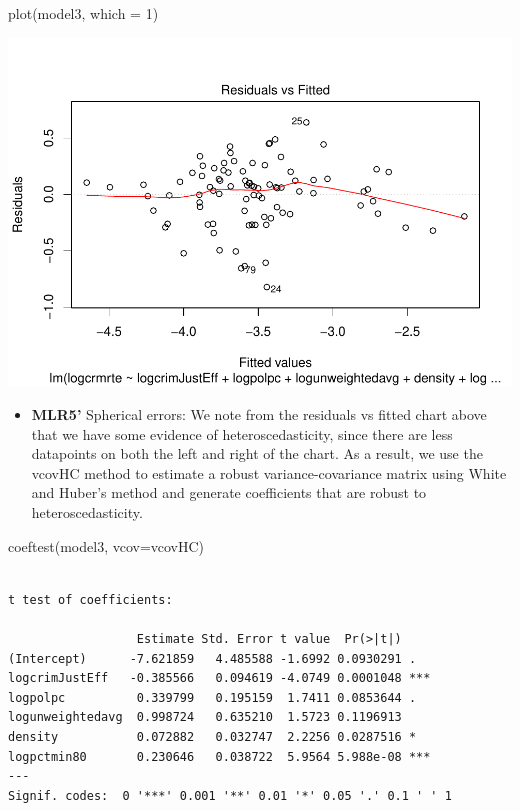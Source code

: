 \documentclass[]{article}
\newenvironment{Shaded}{}{}
\newcommand{\DataTypeTok}[1]{#1}
\newcommand{\DecValTok}[1]{#1}
\newcommand{\KeywordTok}[1]{\textcolor[rgb]{0.00,0.00,1.00}{#1}}
\newcommand{\NormalTok}[1]{#1}
\providecommand{\tightlist}{%
  \setlength{\itemsep}{0pt}\setlength{\parskip}{0pt}}
\begin{document}
\begin{Shaded}
\begin{Highlighting}[]
\KeywordTok{plot}\NormalTok{(model3, }\DataTypeTok{which =} \DecValTok{1}\NormalTok{)}
\end{Highlighting}
\end{Shaded}

\includegraphics{Bagnard_Gaustad_Hartman_Leung_Lab_3_files/figure-latex/unnamed-chunk-99-1.pdf}

\begin{itemize}
\tightlist
\item
  \textbf{MLR5'} Spherical errors: We note from the residuals vs fitted
  chart above that we have some evidence of heteroscedasticity, since
  there are less datapoints on both the left and right of the chart. As
  a result, we use the vcovHC method to estimate a robust
  variance-covariance matrix using White and Huber's method and generate
  coefficients that are robust to heteroscedasticity.
\end{itemize}

\begin{Shaded}
\begin{Highlighting}[]
\KeywordTok{coeftest}\NormalTok{(model3, }\DataTypeTok{vcov=}\NormalTok{vcovHC)}
\end{Highlighting}
\end{Shaded}

\begin{verbatim}

t test of coefficients:

                  Estimate Std. Error t value  Pr(>|t|)    
(Intercept)      -7.621859   4.485588 -1.6992 0.0930291 .  
logcrimJustEff   -0.385566   0.094619 -4.0749 0.0001048 ***
logpolpc          0.339799   0.195159  1.7411 0.0853644 .  
logunweightedavg  0.998724   0.635210  1.5723 0.1196913    
density           0.072882   0.032747  2.2256 0.0287516 *  
logpctmin80       0.230646   0.038722  5.9564 5.988e-08 ***
---
Signif. codes:  0 '***' 0.001 '**' 0.01 '*' 0.05 '.' 0.1 ' ' 1
\end{verbatim}
\end{document}
